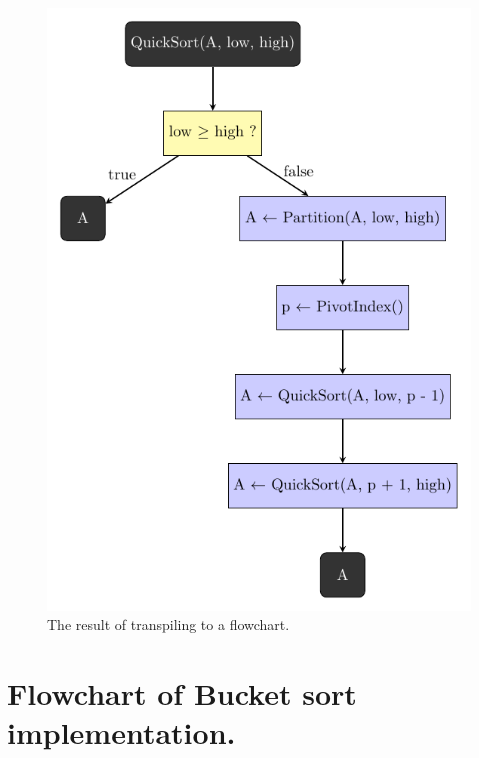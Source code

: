 \begin{figure}[ht!]
    \centering
    \includegraphics[scale=.6]{assets/chapter6/sort/QuickSort_ibp.pdf}
    \caption{The result of transpiling  to a flowchart.}
    \label{quickSortIBP}
\end{figure}

\section{Flowchart of Bucket sort implementation.}
\label{Flowchart of Bucket sort implementation.}

